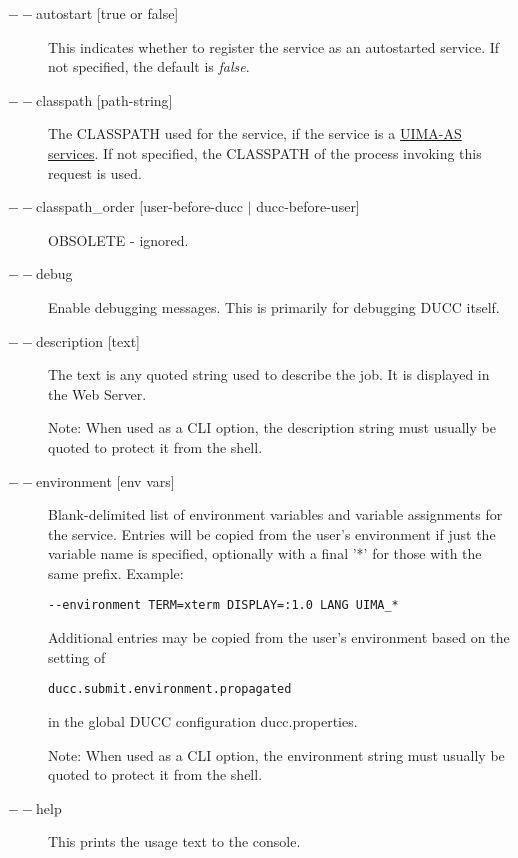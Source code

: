     \begin{description}

        \item[$--$autostart {[true or false]}] This indicates whether to register the service as
          an autostarted service.  If not specified, the default is {\em false}.

        \item[$--$classpath {[path-string]}] The CLASSPATH used for the service, if the service is a
          \hyperref[sec:services.types]{UIMA-AS services}.  If not specified, the CLASSPATH of the
          process invoking this request is used.

        \item[$--$classpath\_order {[user-before-ducc $|$ ducc-before-user]} ]  
          OBSOLETE - ignored.

        \item[$--$debug ]
          Enable debugging messages. This is primarily for debugging DUCC itself. 
          
        \item[$--$description {[text]}] The text is any quoted string used to describe the job. It is
          displayed in the Web Server.

          Note: When used as a CLI option, the description string must usually be quoted to protect
          it from the shell.
    
        \item[$--$environment {[env vars]}] Blank-delimited list of environment variables and variable
          assignments for the service.
          Entries will be copied from the user's environment if just the variable name is
          specified, optionally with a final '*' for those with the same prefix. Example:
          \begin{verbatim}
--environment TERM=xterm DISPLAY=:1.0 LANG UIMA_*
          \end{verbatim}

          Additional entries may be copied from the user's environment based on the setting of
\begin{verbatim}
ducc.submit.environment.propagated
\end{verbatim}
          in the global DUCC configuration ducc.properties.
        
          Note: When used as a CLI option, the environment string must usually be
          quoted to protect it from the shell.
          
        \item[$--$help ] This prints the usage text to the console.


\end{description}
